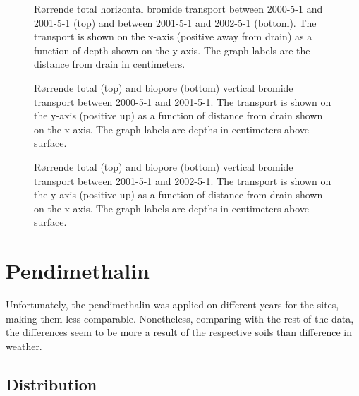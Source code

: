 \begin{figure}[htbp]
  \centering
  
  \caption{R{\o}rrende total horizontal bromide transport between 2000-5-1 and
    2001-5-1 (top) and between 2001-5-1 and 2002-5-1 (bottom).  The
    transport is shown on the x-axis (positive away from drain) as a
    function of depth shown on the y-axis.  The graph labels are the
    distance from drain in centimeters.}
  \label{fig:Rorrende-Bromide-horizontal}
\end{figure}

\begin{figure}[htbp]
  \centering
  
  \caption{R{\o}rrende total (top) and biopore (bottom) vertical bromide
    transport between 2000-5-1 and 2001-5-1.  The transport is shown on the
    y-axis (positive up) as a function of distance from drain shown on
    the x-axis.  The graph labels are depths in centimeters above
    surface.}
  \label{fig:Rorrende-Bromide-2000-vertical}
\end{figure}

\begin{figure}[htbp]
  \centering
  
  \caption{R{\o}rrende total (top) and biopore (bottom) vertical bromide
    transport between 2001-5-1 and 2002-5-1.  The transport is shown on the
    y-axis (positive up) as a function of distance from drain shown on
    the x-axis.  The graph labels are depths in centimeters above
    surface.}
  \label{fig:Rorrende-Bromide-2001-vertical}
\end{figure}

\FloatBarrier
\section{Pendimethalin}

Unfortunately, the pendimethalin was applied on different years for the
sites, making them less comparable.  Nonetheless, comparing with the
rest of the data, the differences seem to be more a result of the
respective soils than difference in weather.

\subsection{Distribution}

